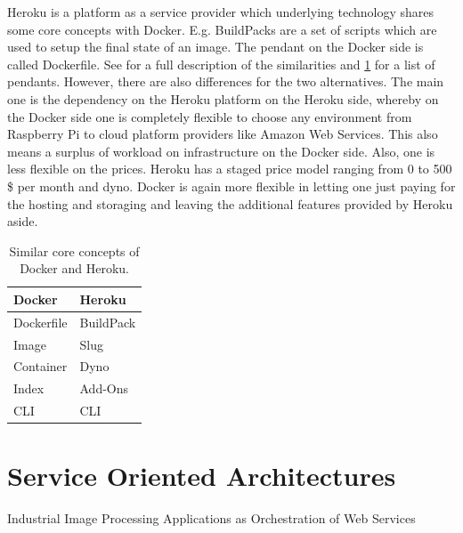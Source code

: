 Heroku is a platform as a service provider which underlying technology shares some core concepts with Docker. E.g. BuildPacks are a set of scripts which are used to setup the final state of an image. The pendant on the Docker side is called Dockerfile. See \cite{ThurigLastvisited2018-27-112014DockerHeroku} for a full description of the similarities and \ref{dockerandheroku} for a list of pendants. However, there are also differences for the two alternatives. The main one is the dependency on the Heroku platform on the Heroku side, whereby on the Docker side one is completely flexible to choose any environment from Raspberry Pi to cloud platform providers like Amazon Web Services. This also means a surplus of workload on infrastructure on the Docker side. Also, one is less flexible on the prices. Heroku has a staged price model ranging from 0 to 500\,\$ per month and dyno. Docker is again more flexible in letting one just paying for the hosting and storaging and leaving the additional features provided by Heroku aside. \cite{ChrisLastvisited2018-11-272017WhyDocker} 


\begin{table}
\begin{center}
      \caption{Similar core concepts of Docker and Heroku. \cite{ThurigLastvisited2018-27-112014DockerHeroku}}
  \begin{tabular}{ l | l }
    Docker & Heroku  \\ \hline
Dockerfile &	BuildPack \\ 
Image	& Slug\\ 
Container&	Dyno\\ 
Index	&Add-Ons\\ 
CLI	&CLI
  \end{tabular}
  \label{dockerandheroku}
\end{center}
\end{table}

\section{Service Oriented Architectures}
Industrial Image Processing Applications as Orchestration of Web Services
